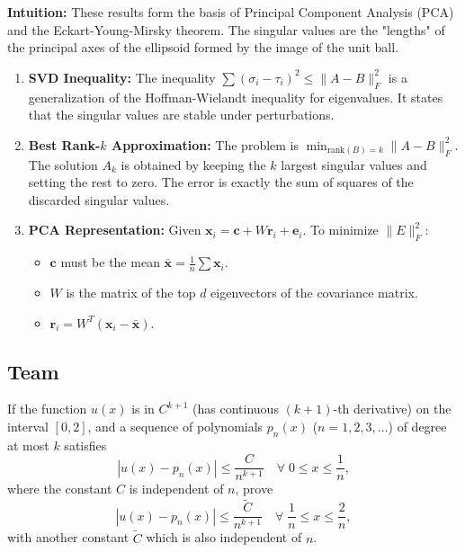 \begin{solution}
\textbf{Intuition:} These results form the basis of Principal Component Analysis (PCA) and the Eckart-Young-Mirsky theorem. The singular values are the "lengths" of the principal axes of the ellipsoid formed by the image of the unit ball.

\begin{enumerate}
\item[(1)] \textbf{SVD Inequality:}
The inequality $\sum (\sigma_i - \tau_i)^2 \leq \|A-B\|_F^2$ is a generalization of the Hoffman-Wielandt inequality for eigenvalues. It states that the singular values are stable under perturbations.
\item[(2)] \textbf{Best Rank-$k$ Approximation:}
The problem is $\min_{\text{rank}(B)=k} \|A-B\|_F^2$. The solution $A_k$ is obtained by keeping the $k$ largest singular values and setting the rest to zero. The error is exactly the sum of squares of the discarded singular values.
\item[(3)] \textbf{PCA Representation:}
Given $\mathbf{x}_i = \mathbf{c} + W\mathbf{r}_i + \mathbf{e}_i$.
To minimize $\|E\|_F^2$:
\begin{itemize}
    \item $\mathbf{c}$ must be the mean $\bar{\mathbf{x}} = \frac{1}{n} \sum \mathbf{x}_i$.
    \item $W$ is the matrix of the top $d$ eigenvectors of the covariance matrix.
    \item $\mathbf{r}_i = W^T(\mathbf{x}_i - \bar{\mathbf{x}})$.
\end{itemize}
\end{enumerate}
\end{solution}

\subsection{Team}

\begin{exercise}
\label{applied:2012:5}
If the function $u(x)$ is in $C^{k+1}$ (has continuous $(k+1)$-th derivative) on the interval $[0,2]$, and a sequence of polynomials $p_n(x)$ ($n=1,2,3,\ldots$) of degree at most $k$ satisfies
\[
\left|u(x)-p_n(x)\right|\leq\frac{C}{n^{k+1}}\quad\forall\;0\leq x\leq\frac{1}{n},
\]
where the constant $C$ is independent of $n$, prove
\[
\left|u(x)-p_n(x)\right|\leq\frac{\tilde{C}}{n^{k+1}}\quad\forall\;\frac{1}{n}\leq x\leq\frac{2}{n},
\]
with another constant $\tilde{C}$ which is also independent of $n$.
\end{exercise}

